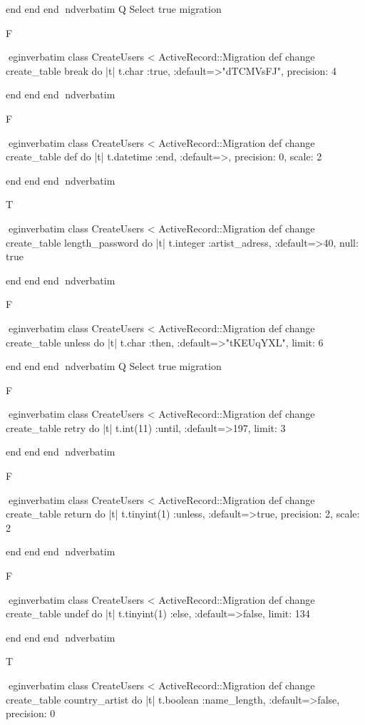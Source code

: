     end 
  end 
end
nd{verbatim}
Q
 Select true migration

F

egin{verbatim}
 class CreateUsers < ActiveRecord::Migration 
  def change 
    create_table break do |t| 
      t.char :true, :default=>"dTCMVsFJ", precision: 4
    
    end 
  end 
end
nd{verbatim}

F

egin{verbatim}
 class CreateUsers < ActiveRecord::Migration 
  def change 
    create_table def do |t| 
      t.datetime :end, :default=>, precision: 0, scale: 2
    
    end 
  end 
end
nd{verbatim}

T

egin{verbatim}
 class CreateUsers < ActiveRecord::Migration 
  def change 
    create_table length_password do |t| 
      t.integer :artist_adress, :default=>40, null: true
    
    end 
  end 
end
nd{verbatim}

F

egin{verbatim}
 class CreateUsers < ActiveRecord::Migration 
  def change 
    create_table unless do |t| 
      t.char :then, :default=>"tKEUqYXL", limit: 6
    
    end 
  end 
end
nd{verbatim}
Q
 Select true migration

F

egin{verbatim}
 class CreateUsers < ActiveRecord::Migration 
  def change 
    create_table retry do |t| 
      t.int(11) :until, :default=>197, limit: 3
    
    end 
  end 
end
nd{verbatim}

F

egin{verbatim}
 class CreateUsers < ActiveRecord::Migration 
  def change 
    create_table return do |t| 
      t.tinyint(1) :unless, :default=>true, precision: 2, scale: 2
    
    end 
  end 
end
nd{verbatim}

F

egin{verbatim}
 class CreateUsers < ActiveRecord::Migration 
  def change 
    create_table undef do |t| 
      t.tinyint(1) :else, :default=>false, limit: 134
    
    end 
  end 
end
nd{verbatim}

T

egin{verbatim}
 class CreateUsers < ActiveRecord::Migration 
  def change 
    create_table country_artist do |t| 
      t.boolean :name_length, :default=>false, precision: 0
    
